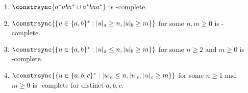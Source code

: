 \begin{example}
\begin{enumerate}
\item $\constrsync{a^*aba^* \cup a^*baa^*}$ is \LOGSPACE-complete.

\item $\constrsync{\{ u \in \{a,b\}^* : |u|_a \ge n, |u|_b \ge m\}}$ for some $n,m \ge 0$ is \NL-complete.
	
\item $\constrsync{\{ u \in \{a,b\}^* : |u|_a \le n, |u|_b \ge m \}}$ for some $n \ge 2$ and $m \ge 0$ is \NP-complete.
	
\item $\constrsync{\{ u \in \{a,b,c\}^* : |u|_a \le n, |u|_b, |u|_c \ge m \}}$ for some $n \ge 1$ and $m \ge 0$
	is \PSPACE-complete for distinct $a,b,c$.
\end{enumerate}	
\end{example}